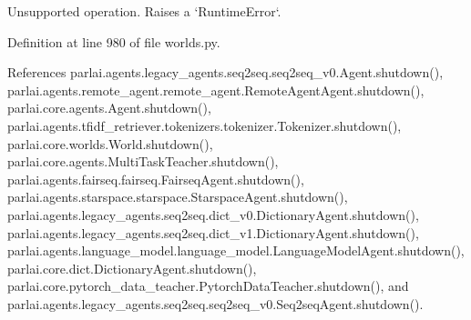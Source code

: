 \begin{DoxyVerb}Unsupported operation. Raises a `RuntimeError`.\end{DoxyVerb}
 

Definition at line 980 of file worlds.\+py.



References parlai.\+agents.\+legacy\+\_\+agents.\+seq2seq.\+seq2seq\+\_\+v0.\+Agent.\+shutdown(), parlai.\+agents.\+remote\+\_\+agent.\+remote\+\_\+agent.\+Remote\+Agent\+Agent.\+shutdown(), parlai.\+core.\+agents.\+Agent.\+shutdown(), parlai.\+agents.\+tfidf\+\_\+retriever.\+tokenizers.\+tokenizer.\+Tokenizer.\+shutdown(), parlai.\+core.\+worlds.\+World.\+shutdown(), parlai.\+core.\+agents.\+Multi\+Task\+Teacher.\+shutdown(), parlai.\+agents.\+fairseq.\+fairseq.\+Fairseq\+Agent.\+shutdown(), parlai.\+agents.\+starspace.\+starspace.\+Starspace\+Agent.\+shutdown(), parlai.\+agents.\+legacy\+\_\+agents.\+seq2seq.\+dict\+\_\+v0.\+Dictionary\+Agent.\+shutdown(), parlai.\+agents.\+legacy\+\_\+agents.\+seq2seq.\+dict\+\_\+v1.\+Dictionary\+Agent.\+shutdown(), parlai.\+agents.\+language\+\_\+model.\+language\+\_\+model.\+Language\+Model\+Agent.\+shutdown(), parlai.\+core.\+dict.\+Dictionary\+Agent.\+shutdown(), parlai.\+core.\+pytorch\+\_\+data\+\_\+teacher.\+Pytorch\+Data\+Teacher.\+shutdown(), and parlai.\+agents.\+legacy\+\_\+agents.\+seq2seq.\+seq2seq\+\_\+v0.\+Seq2seq\+Agent.\+shutdown().


